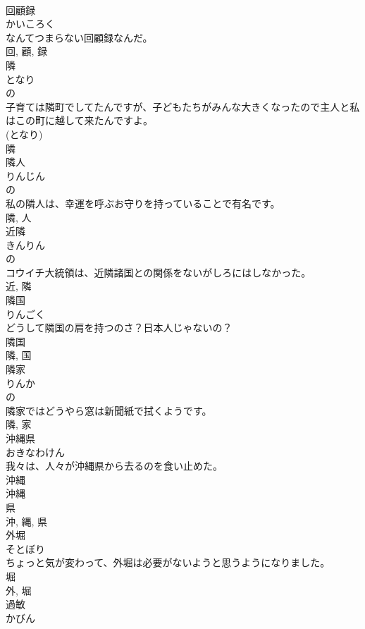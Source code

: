 \documentclass[8pt]{extreport}
\begin{document}
\begin{CJK}{UTF8}{min}
\\	回顧録	
\\	かいころく	
\\	なんてつまらない回顧録なんだ。	
\\	回, 顧, 録	
\\	隣	
\\	となり	
\\	の 
\\	子育ては隣町でしてたんですが、子どもたちがみんな大きくなったので主人と私はこの町に越して来たんですよ。	
\\	(となり) 
\\	隣	
\\	隣人	
\\	りんじん	
\\	の 
\\	私の隣人は、幸運を呼ぶお守りを持っていることで有名です。	
\\	隣, 人	
\\	近隣	
\\	きんりん	
\\	の 
\\	コウイチ大統領は、近隣諸国との関係をないがしろにはしなかった。	
\\	近, 隣	
\\	隣国	
\\	りんごく	
\\	どうして隣国の肩を持つのさ？日本人じゃないの？	
\\	隣国 
\\	隣, 国	
\\	隣家	
\\	りんか	
\\	の 
\\	隣家ではどうやら窓は新聞紙で拭くようです。	
\\	隣, 家	
\\	沖縄県	
\\	おきなわけん	
\\	我々は、人々が沖縄県から去るのを食い止めた。	
\\	沖縄 
\\	沖縄 
\\	県 
\\	沖, 縄, 県	
\\	外堀	
\\	そとぼり	
\\	ちょっと気が変わって、外堀は必要がないようと思うようになりました。	
\\	堀 
\\	外, 堀	
\\	過敏	
\\	かびん	

\end{CJK}
\end{document}
